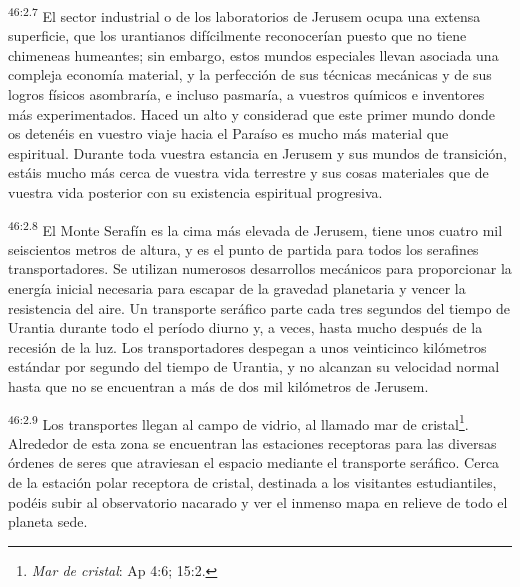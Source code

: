 \par
\textsuperscript{46:2.7} El sector industrial o de los laboratorios de Jerusem ocupa una extensa superficie, que los urantianos difícilmente reconocerían puesto que no tiene chimeneas humeantes; sin embargo, estos mundos especiales llevan asociada una compleja economía material, y la perfección de sus técnicas mecánicas y de sus logros físicos asombraría, e incluso pasmaría, a vuestros químicos e inventores más experimentados. Haced un alto y considerad que este primer mundo donde os detenéis en vuestro viaje hacia el Paraíso es mucho más material que espiritual. Durante toda vuestra estancia en Jerusem y sus mundos de transición, estáis mucho más cerca de vuestra vida terrestre y sus cosas materiales que de vuestra vida posterior con su existencia espiritual progresiva.

\par
\textsuperscript{46:2.8} El Monte Serafín es la cima más elevada de Jerusem, tiene unos cuatro mil seiscientos metros de altura, y es el punto de partida para todos los serafines transportadores. Se utilizan numerosos desarrollos mecánicos para proporcionar la energía inicial necesaria para escapar de la gravedad planetaria y vencer la resistencia del aire. Un transporte seráfico parte cada tres segundos del tiempo de Urantia durante todo el período diurno y, a veces, hasta mucho después de la recesión de la luz. Los transportadores despegan a unos veinticinco kilómetros estándar por segundo del tiempo de Urantia, y no alcanzan su velocidad normal hasta que no se encuentran a más de dos mil kilómetros de Jerusem.

\par
\textsuperscript{46:2.9} Los transportes llegan al campo de vidrio, al llamado mar de cristal\footnote{\textit{Mar de cristal}: Ap 4:6; 15:2.}. Alrededor de esta zona se encuentran las estaciones receptoras para las diversas órdenes de seres que atraviesan el espacio mediante el transporte seráfico. Cerca de la estación polar receptora de cristal, destinada a los visitantes estudiantiles, podéis subir al observatorio nacarado y ver el inmenso mapa en relieve de todo el planeta sede.

